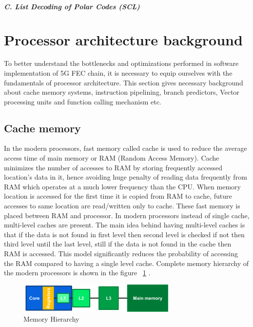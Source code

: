 \paragraph{\emph{C. List Decoding of Polar Codes (SCL)}\newline}  \label{SCL}


\section{Processor architecture background}
To better understand the bottlenecks and optimizations performed in software implementation of 5G FEC chain, it is necessary to equip ourselves with the fundamentals of processor architecture. This section gives necessary background about cache memory systems, instruction pipelining, branch predictors, Vector processing units and function calling mechanism etc.

\subsection{Cache memory} \label{cacheSection}
In the modern processors, fast memory called cache is used to reduce the average access time of main memory or RAM (Random Access Memory). Cache minimizes the number of accesses to RAM by storing frequently accessed location's data in it, hence avoiding huge penalty of reading data frequently from RAM which operates at a much lower frequency than the CPU. When memory location is accessed for the first time it is copied from RAM to cache, future accesses to same location are read/written only to cache. These fast memory is placed between RAM and processor. In modern processors instead of single cache, multi-level caches are present. The main idea behind having multi-level caches is that if the data is not found in first level then second level is checked if not then third level until the last level, still if the data is not found in the cache then RAM is accessed. This model significantly reduces the probability of accessing the RAM compared to having a single level cache. Complete memory hierarchy of the modern processors is shown in the figure  ~\ref{fig:memoryHierarchy} \cite{CMP}.

\begin{figure}[h]
	\centering
	\includegraphics[width=0.7\textwidth]{./figures/memoryHierarchy.pdf}
	\caption{Memory Hierarchy}
	\label{fig:memoryHierarchy}
\end{figure}

